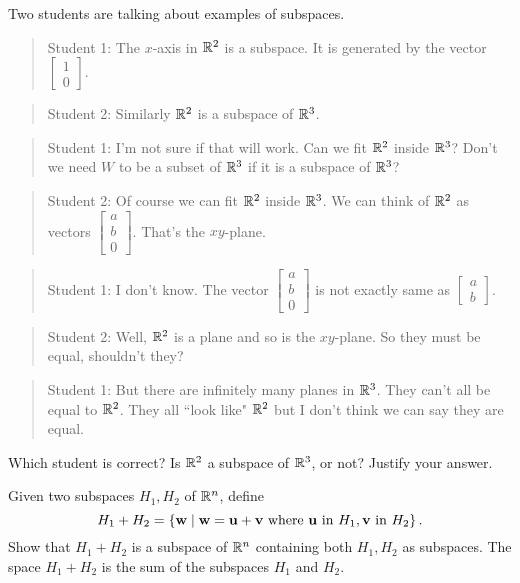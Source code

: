 \item Two students are talking about examples of subspaces. 
\begin{quote}
Student 1: The $x$-axis in $\mathbb{R}^2$ is a subspace. It is generated by the vector $\left[ \begin{array}{c} 1\\0 \end{array}\right]$. 
\end{quote} 
\begin{quote}
Student 2: Similarly $\mathbb{R}^2$ is a subspace of $\mathbb{R}^3$. 
\end{quote} 
\begin{quote}
Student 1: I'm not sure if that will work. Can we fit $\mathbb{R}^2$ inside $\mathbb{R}^3$? Don't we need $W$ to be a subset of $\mathbb{R}^3$ if it is a subspace of $\mathbb{R}^3$?
\end{quote} 
\begin{quote}
Student 2: Of course we can fit $\mathbb{R}^2$ inside $\mathbb{R}^3$. We can think of $\mathbb{R}^2$ as vectors $\left[ \begin{array}{c} a\\b\\0 \end{array} \right]$. That's the $xy$-plane.
\end{quote} 
\begin{quote}
Student 1: I don't know. The vector $\left[ \begin{array}{c} a\\b\\0 \end{array} \right]$ is not exactly same as $\left[ \begin{array}{c} a\\b \end{array} \right]$. 
\end{quote}
\begin{quote}
Student 2: Well, $\mathbb{R}^2$ is a plane and so is the $xy$-plane. So they must be equal, shouldn't they? 
\end{quote} 
\begin{quote}
Student 1: But there are infinitely many planes in $\mathbb{R}^3$. They can't all be equal to $\mathbb{R}^2$. They all ``look like" $\mathbb{R}^2$ but I don't think we can say they are equal.
\end{quote}
Which student is correct? Is $\mathbb{R}^2$ a subspace of $\mathbb{R}^3$, or not? Justify your answer.

\item \label{ex:3_a_sum} Given two subspaces $H_1, H_2$ of $\mathbb{R}^n$, define 
\[ H_1+H_2 = \{ \mathbf{w} \mid \mathbf{w}=\mathbf{u}+\mathbf{v} \text{ where } \mathbf{u} \text{ in }H_1, \mathbf{v} \text{ in }H_2\} \,.\]
Show that $H_1+H_2$ is a subspace of $\mathbb{R}^n$ containing both $H_1, H_2$ as subspaces. The space $H_1+H_2$ is the sum of the subspaces $H_1$ and $H_2$.

